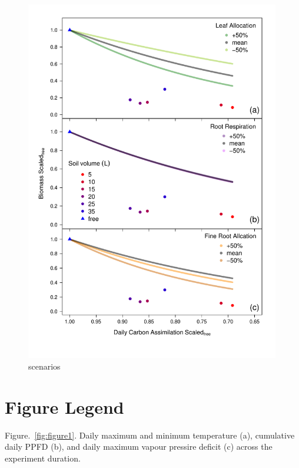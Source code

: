 \documentclass[a4paper]{article}\usepackage[]{graphicx}\usepackage[]{color}
\begin{document}
\begin{figure}[h!]
    \centering
    \includegraphics[width=0.99\textwidth]{gc_Day_scenario.pdf}
    \caption{scenarios}
    \label{fig:figureSI1}
\end{figure}
\clearpage

\clearpage
\section*{Figure Legend}

Figure.~\ref{fig:figure1}.  Daily maximum and minimum temperature (a), cumulative daily PPFD (b), and daily maximum vapour pressire deficit (c) across the experiment duration.
\end{document}
